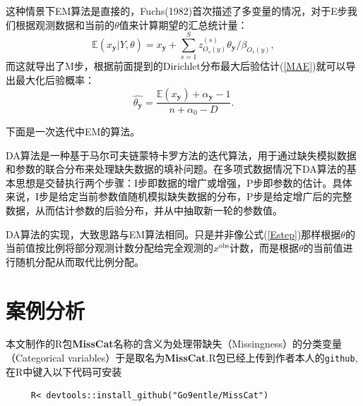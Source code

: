 \documentclass[12pt,hyperref,a4paper,UTF8]{ctexart}
\begin{document}
这种情景下EM算法是直接的，Fuchs(1982)首次描述了多变量的情况，对于E步我们根据观测数据和当前的$\theta$值来计算期望的汇总统计量：
\begin{equation}
    \mathbb{E}(x_{\boldsymbol{y}}|Y,\theta)=x_{\boldsymbol{y}}+\sum_{s=1}^Sz_{O_s(y)}^{(s)}\theta_{\boldsymbol{y}}/\beta_{O_s(y)},\label{Estep}
\end{equation}
而这就导出了M步，根据前面提到的Dirichlet分布最大后验估计(\ref{MAE})就可以导出最大化后验概率：
\begin{equation*}
    \hat{\theta_{\boldsymbol{y}}}=\frac{\mathbb{E}(x_{\boldsymbol{y}})+\alpha_{\boldsymbol{y}}-1}{n+\alpha_0-D}.
\end{equation*}

下面是一次迭代中EM的算法。

\begin{algorithm}[H]
    \caption{1 iteration of EM for saturated multinomial model}
\end{algorithm}

DA算法是一种基于马尔可夫链蒙特卡罗方法的迭代算法，用于通过缺失模拟数据和参数的联合分布来处理缺失数据的填补问题。在多项式数据情况下DA算法的基本思想是交替执行两个步骤：I步即数据的增广或增强，P步即参数的估计。具体来说，I步是给定当前参数值随机模拟缺失数据的分布，P步是给定增广后的完整数据，从而估计参数的后验分布，并从中抽取新一轮的参数值。

DA算法的实现，大致思路与EM算法相同。只是并非像公式(\ref{Estep})那样根据$\theta$的当前值按比例将部分观测计数分配给完全观测的$x^{\text{obs}}$计数，而是根据$\theta$的当前值进行随机分配从而取代比例分配。







  \section{案例分析}
  本文制作的R包\textbf{MissCat}名称的含义为处理带缺失（Missingness）的分类变量（Categorical variables）于是取名为\textbf{MissCat}.R包已经上传到作者本人的\texttt{github},在R中键入以下代码可安装
  \begin{verbatim}
     R< devtools::install_github("Go9entle/MissCat")
  \end{verbatim}
\end{document}
